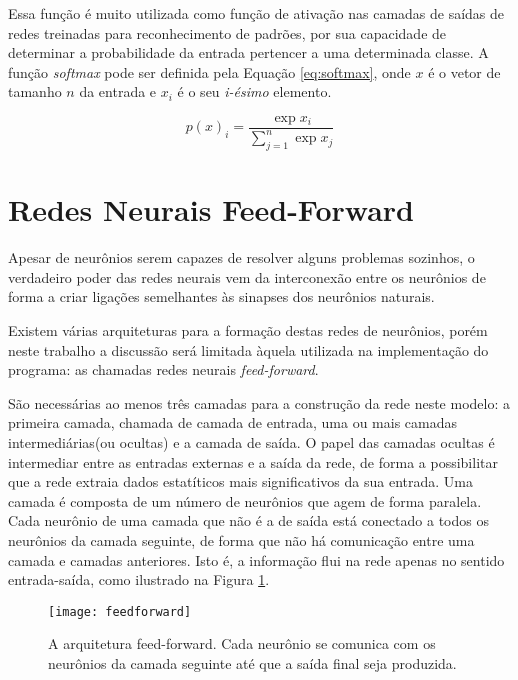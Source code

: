 Essa função é muito utilizada como função de ativação nas camadas de saídas de redes treinadas para reconhecimento de padrões, por sua capacidade de determinar a probabilidade da entrada pertencer a uma determinada classe. A função \textit{softmax} pode ser definida pela Equação \ref{eq:softmax}, onde $x$ é o vetor de tamanho $n$ da entrada e $x_i$ é o seu \textit{i-ésimo} elemento.

\begin{equation}
p(x)_i = \frac{\exp{x_i}}{\sum_{j=1}^n\exp{x_j}}
\label{eq:softmax}
\end{equation}




\section{Redes Neurais Feed-Forward}

Apesar de neurônios serem capazes de resolver alguns problemas sozinhos, o verdadeiro poder das redes neurais vem da interconexão entre os neurônios de forma a criar ligações semelhantes às sinapses dos neurônios naturais.

Existem várias arquiteturas para a formação destas redes de neurônios, porém neste trabalho a discussão será limitada àquela utilizada na implementação do programa: as chamadas redes neurais \textit{feed-forward}.

São necessárias ao menos três camadas para a construção da rede neste modelo: a primeira camada, chamada de camada de entrada, uma ou mais camadas intermediárias(ou ocultas) e a camada de saída. O papel das camadas ocultas é intermediar entre as entradas externas e a saída da rede, de forma a possibilitar que a rede extraia dados estatíticos mais significativos da sua entrada.  Uma camada é composta de um número de neurônios que agem de forma paralela. Cada neurônio de uma camada que não é a de saída está conectado a todos os neurônios da camada seguinte, de forma que não há comunicação entre uma camada e camadas anteriores. Isto é, a informação flui na rede apenas no sentido entrada-saída, como ilustrado na Figura \ref{fig:feedfoward}.

\begin{figure}
\centering
\texttt{[image: feedforward]}
\caption[A arquitetura feed-forward. Cada neurônio se comunica com os neurônios da camada seguinte até que a saída final seja produzida.]{A arquitetura feed-forward. Cada neurônio se comunica com os neurônios da camada seguinte até que a saída final seja produzida.\protect\footnotemark}
\label{fig:feedfoward}
\centering
\end{figure}


